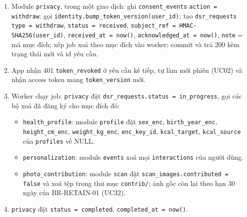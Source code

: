 \begin{enumerate}
\item Module {\small\texttt{privacy}}, trong một giao dịch: ghi {\small\texttt{consent\_\allowbreak{}\allowbreak{}events}} {\small\texttt{action = withdraw}}; gọi {\small\texttt{identity.\allowbreak{}bump\_\allowbreak{}\allowbreak{}token\_\allowbreak{}\allowbreak{}version(user\_\allowbreak{}\allowbreak{}id)}}; tạo {\small\texttt{dsr\_\allowbreak{}\allowbreak{}requests}} {\small\texttt{type = withdraw}}, {\small\texttt{status = received}}, {\small\texttt{subject\_\allowbreak{}\allowbreak{}ref = HMAC-\allowbreak{}SHA256(user\_\allowbreak{}\allowbreak{}id)}}, {\small\texttt{received\_\allowbreak{}\allowbreak{}at = now()}}, {\small\texttt{acknowledged\_\allowbreak{}\allowbreak{}at = now()}}, {\small\texttt{note}} = mã mục đích; xếp job xoá theo mục đích vào worker; commit và trả 200 kèm trạng thái mới và id yêu cầu.
\item App nhận 401 {\small\texttt{token\_\allowbreak{}\allowbreak{}revoked}} ở yêu cầu kế tiếp, tự làm mới phiên (UC02) và nhận access token mang {\small\texttt{token\_\allowbreak{}\allowbreak{}version}} mới.
\item Worker chạy job: {\small\texttt{privacy}} đặt {\small\texttt{dsr\_\allowbreak{}\allowbreak{}requests.\allowbreak{}status = in\_\allowbreak{}\allowbreak{}progress}}, gọi các bộ xoá đã đăng ký cho mục đích đó:\begin{itemize}
\item {\small\texttt{health\_\allowbreak{}\allowbreak{}profile}}: module {\small\texttt{profile}} đặt {\small\texttt{sex\_\allowbreak{}\allowbreak{}enc}}, {\small\texttt{birth\_\allowbreak{}\allowbreak{}year\_\allowbreak{}\allowbreak{}enc}}, {\small\texttt{height\_\allowbreak{}\allowbreak{}cm\_\allowbreak{}\allowbreak{}enc}}, {\small\texttt{weight\_\allowbreak{}\allowbreak{}kg\_\allowbreak{}\allowbreak{}enc}}, {\small\texttt{enc\_\allowbreak{}\allowbreak{}key\_\allowbreak{}\allowbreak{}id}}, {\small\texttt{kcal\_\allowbreak{}\allowbreak{}target}}, {\small\texttt{kcal\_\allowbreak{}\allowbreak{}source}} của {\small\texttt{profiles}} về NULL.
\item {\small\texttt{personalization}}: module {\small\texttt{events}} xoá mọi {\small\texttt{interactions}} của người dùng.
\item {\small\texttt{photo\_\allowbreak{}\allowbreak{}contribution}}: module {\small\texttt{scan}} đặt {\small\texttt{scan\_\allowbreak{}\allowbreak{}images.\allowbreak{}contributed = false}} và xoá tệp trong thư mục {\small\texttt{contrib/\allowbreak{}\allowbreak{}}}; ảnh gốc còn lại theo hạn 30 ngày của BR-\allowbreak{}RETAIN-\allowbreak{}01 (UC32).
\end{itemize}


\item {\small\texttt{privacy}} đặt {\small\texttt{status = completed}}, {\small\texttt{completed\_\allowbreak{}\allowbreak{}at = now()}}.
\end{enumerate}
